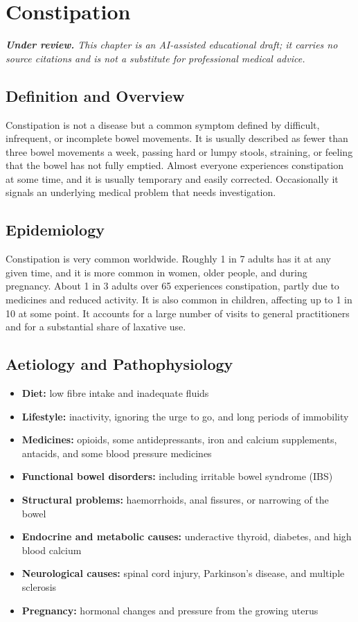 \chapter{Constipation}

\medskip
\noindent\textit{\textbf{Under review.} This chapter is an AI-assisted educational draft; it carries no source citations and is not a substitute for professional medical advice.}

\section*{Definition and Overview}
Constipation is not a disease but a common symptom defined by difficult, infrequent, or incomplete bowel movements. It is usually described as fewer than three bowel movements a week, passing hard or lumpy stools, straining, or feeling that the bowel has not fully emptied. Almost everyone experiences constipation at some time, and it is usually temporary and easily corrected. Occasionally it signals an underlying medical problem that needs investigation.

\section*{Epidemiology}
Constipation is very common worldwide. Roughly 1 in 7 adults has it at any given time, and it is more common in women, older people, and during pregnancy. About 1 in 3 adults over 65 experiences constipation, partly due to medicines and reduced activity. It is also common in children, affecting up to 1 in 10 at some point. It accounts for a large number of visits to general practitioners and for a substantial share of laxative use.

\section*{Aetiology and Pathophysiology}
\begin{itemize}
    \item \textbf{Diet:} low fibre intake and inadequate fluids
    \item \textbf{Lifestyle:} inactivity, ignoring the urge to go, and long periods of immobility
    \item \textbf{Medicines:} opioids, some antidepressants, iron and calcium supplements, antacids, and some blood pressure medicines
    \item \textbf{Functional bowel disorders:} including irritable bowel syndrome (IBS)
    \item \textbf{Structural problems:} haemorrhoids, anal fissures, or narrowing of the bowel
    \item \textbf{Endocrine and metabolic causes:} underactive thyroid, diabetes, and high blood calcium
    \item \textbf{Neurological causes:} spinal cord injury, Parkinson's disease, and multiple sclerosis
    \item \textbf{Pregnancy:} hormonal changes and pressure from the growing uterus
\end{itemize}

